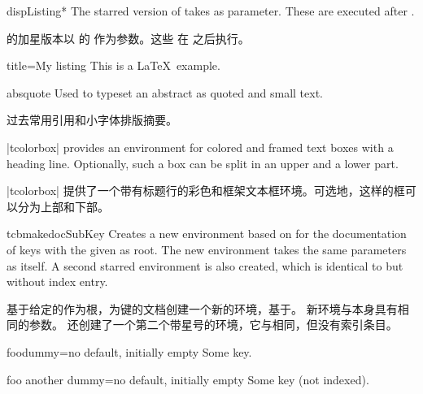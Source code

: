\begin{docEnvironment}{dispListing*}{}
The starred version of  takes  
as parameter. These  are executed after .

 的加星版本以  的  作为参数。这些  在  之后执行。
\begin{dispExample}
\begin{dispListing*}{title=My listing}
This is a \LaTeX\ example.
\end{dispListing*}
\end{dispExample}
\end{docEnvironment}


\begin{docEnvironment}{absquote}{}
Used to typeset an abstract as quoted and small text.

过去常用引用和小字体排版摘要。
\begin{dispExample}
\begin{absquote}
|tcolorbox| provides an environment for colored and framed text boxes with a
heading line. Optionally, such a box can be split in an upper and a lower part.

|tcolorbox| 提供了一个带有标题行的彩色和框架文本框环境。可选地，这样的框可以分为上部和下部。
\end{absquote}
\end{dispExample}
\end{docEnvironment}

\begin{docCommand}[doc updated=2020-04-22]{tcbmakedocSubKey}{}
Creates a new environment  based on  for the
documentation of keys with the given  as root.
The new environment  takes the same para\-meters as  itself.
A second starred environment  is also created, which is identical
to  but without index entry.

基于给定的作为根，为键的文档创建一个新的环境，基于。 新环境与本身具有相同的参数。 还创建了一个第二个带星号的环境，它与相同，但没有索引条目。
\begin{dispExample}

\begin{docFooKey}{foodummy}{=}{no default, initially empty}
Some key.
\end{docFooKey}

\begin{docFooKey*}{foo another dummy}{=}{no default, initially empty}
Some key (not indexed).
\end{docFooKey*}
\end{dispExample}
\end{docCommand}


